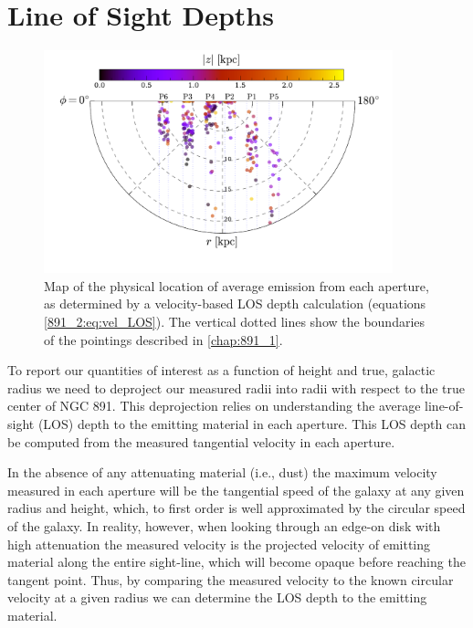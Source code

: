 \section{Line of Sight Depths}
\label{891_2:sec:LOS}

\begin{figure}
  \centering
  \includegraphics[width=0.9\textwidth, trim={0 1.5cm 0 0}, clip]{891_2/figs/velocity_projection.pdf}
  \caption[Map of \GP apertures in cylindrical
    coordinates]{\fixspacing\label{891_2:fig:velocity_projection}Map
    of the physical location of average emission from each aperture,
    as determined by a velocity-based LOS depth calculation (equations
    \ref{891_2:eq:vel_LOS}). The vertical dotted lines show the
    boundaries of the \GP pointings described in \ref{chap:891_1}.}
\end{figure}

To report our quantities of interest as a function of height and true,
galactic radius we need to deproject our measured radii into radii
with respect to the true center of NGC 891. This deprojection relies
on understanding the average line-of-sight (LOS) depth to the emitting
material in each \GP aperture. This LOS depth can be computed from the
measured tangential velocity in each aperture.

In the absence of any attenuating material (i.e., dust) the maximum
velocity measured in each aperture will be the tangential speed of the
galaxy at any given radius and height, which, to first order is well
approximated by the circular speed of the galaxy.  In reality,
however, when looking through an edge-on disk with high attenuation
the measured velocity is the projected velocity of emitting material
along the entire sight-line, which will become opaque before reaching
the tangent point. Thus, by comparing the measured velocity to the
known circular velocity at a given radius we can determine the LOS
depth to the emitting material.

